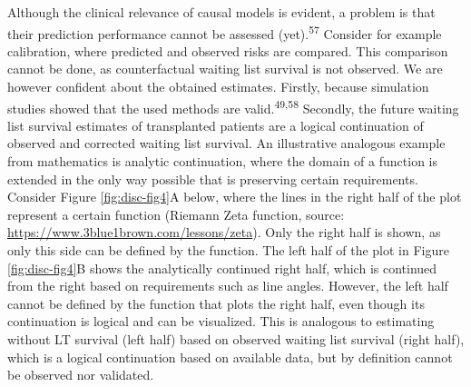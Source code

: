 \documentclass[11pt,english,]{book} %
\begin{document}
Although the clinical relevance of causal models is evident, a problem is that their prediction performance cannot be assessed (yet).\textsuperscript{57} Consider for example calibration, where predicted and observed risks are compared. This comparison cannot be done, as counterfactual waiting list survival is not observed. We are however confident about the obtained estimates. Firstly, because simulation studies showed that the used methods are valid.\textsuperscript{49,58} Secondly, the future waiting list survival estimates of transplanted patients are a logical continuation of observed and corrected waiting list survival. An illustrative analogous example from mathematics is analytic continuation, where the domain of a function is extended in the only way possible that is preserving certain requirements. Consider Figure \ref{fig:disc-fig4}A below, where the lines in the right half of the plot represent a certain function (Riemann Zeta function, source: \url{https://www.3blue1brown.com/lessons/zeta}). Only the right half is shown, as only this side can be defined by the function. The left half of the plot in Figure \ref{fig:disc-fig4}B shows the analytically continued right half, which is continued from the right based on requirements such as line angles. However, the left half cannot be defined by the function that plots the right half, even though its continuation is logical and can be visualized. This is analogous to estimating without LT survival (left half) based on observed waiting list survival (right half), which is a logical continuation based on available data, but by definition cannot be observed nor validated.
\end{document}
